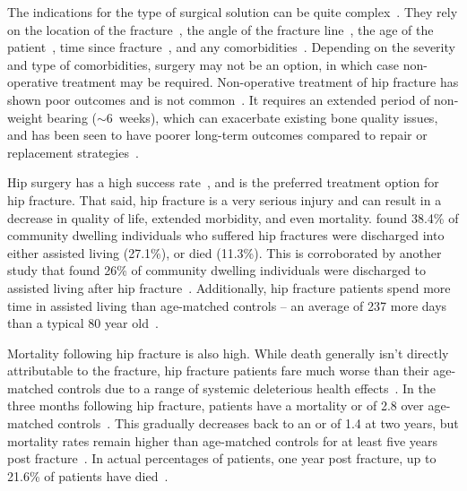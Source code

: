 The indications for the type of surgical solution can be quite complex~\citep{simon_emergency_2011, browner_skeletal_2002}.
They rely on the location of the fracture~\citep{bray_femoral_1997, delamora_introduction_2002}, the angle of the fracture line~\citep{bray_femoral_1997}, the age of the patient~\citep{shah_algorithms_2002,bhandari_internal_2003}, time since fracture~\citep{bray_femoral_1997, delamora_introduction_2002}, and any comorbidities~\citep{shah_algorithms_2002, bhandari_internal_2003}.
Depending on the severity and type of comorbidities, surgery may not be an option, in which case non-operative treatment may be required.
Non-operative treatment of hip fracture has shown poor outcomes and is not common~\citep{heim_nonoperative_2002}.
It requires an extended period of non-weight bearing ($\sim$6~weeks), which can exacerbate existing bone quality issues, and has been seen to have poorer long-term outcomes compared to repair or replacement strategies~\citep{heim_nonoperative_2002}.

Hip surgery has a high success rate~\citep{heim_nonoperative_2002, bhandari_internal_2003, browner_skeletal_2002}, and is the preferred treatment option for hip fracture.
That said, hip fracture is a very serious injury and can result in a decrease in quality of life, extended morbidity, and even mortality.
\citet{wiktorowicz_economic_2001} found 38.4\% of community dwelling individuals who suffered hip fractures were discharged into either assisted living (27.1\%), or died (11.3\%).
This is corroborated by another study that found 26\% of community dwelling individuals were discharged to assisted living after hip fracture~\citep{cooper_crippling_1997}.
Additionally, hip fracture patients spend more time in assisted living than age-matched controls -- an average of 237 more days than a typical 80 year old~\citep{braithwaite_estimating_2003}.

Mortality following hip fracture is also high.
While death generally isn't directly attributable to the fracture, hip fracture patients fare much worse than their age-matched controls due to a range of systemic deleterious health effects~\citep{cooper_crippling_1997}. 
In the three months following hip fracture, patients have a mortality \ac{or} of 2.8 over age-matched controls~\citep{richmond_mortality_2003}.
This gradually decreases back to an \ac{or} of 1.4 at two years, but mortality rates remain higher than age-matched controls for at least five years post fracture~\citep{cooper_crippling_1997}.
In actual percentages of patients, one year post fracture, up to 21.6\% of patients have died~\citep{wiktorowicz_economic_2001}.

